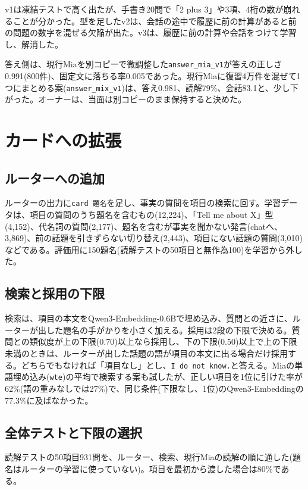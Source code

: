 \documentclass[a4paper,11pt]{article}
\newcommand{\IDK}{\texttt{I do not know.}}
\begin{document}
v1は凍結テストで高く出たが、手書き20問で「2 plus 3」や3項、4桁の数が崩れることが分かった。型を足したv2は、会話の途中で履歴に前の計算があると前の問題の数字を混ぜる欠陥が出た。v3は、履歴に前の計算や会話をつけて学習し、解消した。

答え側は、現行Miaを別コピーで微調整した\texttt{answer\_mia\_v1}が答えの正しさ0.991(800件)、固定文に落ちる率0.005であった。現行Miaに復習4万件を混ぜて1つにまとめる案(\texttt{answer\_mix\_v1})は、答え0.981、読解79\%、会話83.1と、少し下がった。オーナーは、当面は別コピーのまま保持すると決めた。

\section{カードへの拡張}
\subsection{ルーターへの追加}
ルーターの出力に\texttt{card 題名}を足し、事実の質問を項目の検索に回す。学習データは、項目の質問のうち題名を含むもの(12,224)、「Tell me about X」型(4,152)、代名詞の質問(2,177)、題名を含むが事実を聞かない発言(chatへ、3,869)、前の話題を引きずらない切り替え(2,443)、項目にない話題の質問(3,010)などである。評価用に150題名(読解テストの50項目と無作為100)を学習から外した。

\subsection{検索と採用の下限}
検索は、項目の本文をQwen3-Embedding-0.6B\cite{qwen3emb}で埋め込み、質問との近さに、ルーターが出した題名の手がかりを小さく加える。採用は2段の下限で決める。質問との類似度が上の下限(0.70)以上なら採用し、下の下限(0.50)以上で上の下限未満のときは、ルーターが出した話題の語が項目の本文に出る場合だけ採用する。どちらでもなければ「項目なし」とし、\IDK と答える。Miaの単語埋め込み(\texttt{wte})の平均で検索する案も試したが、正しい項目を1位に引けた率が62\%(語の重みなしでは27\%)で、同じ条件(下限なし、1位)のQwen3-Embeddingの77.3\%に及ばなかった。

\subsection{全体テストと下限の選択}
読解テストの50項目931問を、ルーター、検索、現行Miaの読解の順に通した(題名はルーターの学習に使っていない)。項目を最初から渡した場合は80\%である。
\end{document}
